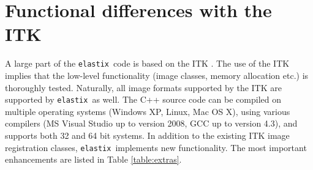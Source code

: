 \documentclass[]{report}
\newcommand{\elastix}{\texttt{elastix}}
\begin{document}
\section{Functional differences with the ITK}

%
%

A large part of the \elastix\ code is based on the ITK
\cite{ITKSoftwareGuideSecondEdition}. The use of the ITK implies
that the low-level functionality (image classes, memory allocation
etc.) is thoroughly tested. Naturally, all image formats supported
by the ITK are supported by \elastix\ as well. The C++ source code
can be compiled on multiple operating systems (Windows XP, Linux,
Mac OS X), using various compilers (MS Visual Studio up to version
2008, GCC up to version 4.3), and supports both 32 and 64 bit
systems. In addition to the existing ITK image registration classes,
\elastix\ implements new functionality. The most important
enhancements are listed in Table \ref{table:extras}.
\end{document}
